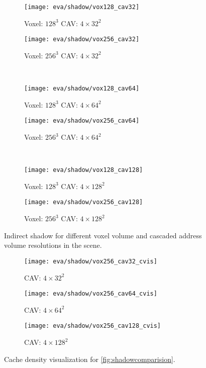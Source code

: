 \documentclass[thesis.tex]{subfiles}
\begin{document}
\begin{figure}
\centering
\begin{subfigure}[b]{\halfpageimage}
\texttt{[image: eva/shadow/vox128\_cav32]}
\caption{Voxel: $128^3$ CAV: $4\times32^2$}
\end{subfigure}
\begin{subfigure}[b]{\halfpageimage}
\texttt{[image: eva/shadow/vox256\_cav32]}
\caption{Voxel: $256^3$ CAV: $4\times32^2$}
\end{subfigure}
\\
\begin{subfigure}[b]{\halfpageimage}
\texttt{[image: eva/shadow/vox128\_cav64]}
\caption{Voxel: $128^3$ CAV: $4\times64^2$}
\end{subfigure}
\begin{subfigure}[b]{\halfpageimage}
\texttt{[image: eva/shadow/vox256\_cav64]}
\caption{Voxel: $256^3$ CAV: $4\times64^2$}
\end{subfigure}
\\
\begin{subfigure}[b]{\halfpageimage}
\texttt{[image: eva/shadow/vox128\_cav128]}
\caption{Voxel: $128^3$ CAV: $4\times128^2$}
\end{subfigure}
\begin{subfigure}[b]{\halfpageimage}
\texttt{[image: eva/shadow/vox256\_cav128]}
\caption{Voxel: $256^3$ CAV: $4\times128^2$}
\end{subfigure}
\caption{Indirect shadow for different voxel volume and cascaded address volume resolutions in the  scene.}
\label{fig:shadowcomparision:resolutions}
\end{figure}

\begin{figure}
\begin{subfigure}[b]{0.32\textwidth}
\texttt{[image: eva/shadow/vox256\_cav32\_cvis]}
\caption{CAV: $4\times32^2$}
\end{subfigure}
\begin{subfigure}[b]{0.32\textwidth}
\texttt{[image: eva/shadow/vox256\_cav64\_cvis]}
\caption{CAV: $4\times64^2$}
\end{subfigure}
\begin{subfigure}[b]{0.32\textwidth}
\texttt{[image: eva/shadow/vox256\_cav128\_cvis]}
\caption{CAV: $4\times128^2$}
\end{subfigure}
\caption{Cache density visualization for \autoref{fig:shadowcomparision}.}
\label{fig:shadowcomparision:resolutions:cavdensities}
\end{figure}
\end{document}

